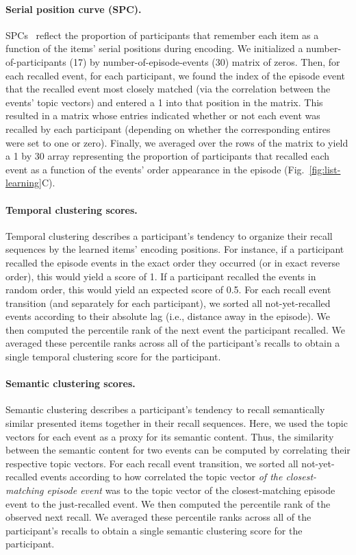 \documentclass{article}
\begin{document}
\paragraph{Serial position curve (SPC).} SPCs~\citep{Murd62a} reflect the proportion of participants that remember each item as a function of the items' serial positions during encoding. We initialized a number-of-participants (17) by number-of-episode-events (30) matrix of zeros. Then, for each recalled event, for each participant, we found the index of the episode event that the recalled event most closely matched (via the correlation between the events' topic vectors) and entered a 1 into that position in the matrix. This resulted in a matrix whose entries indicated whether or not each event was recalled by each participant (depending on whether the corresponding entires were set to one or zero).  Finally, we averaged over the rows of the matrix to yield a 1 by 30 array representing the proportion of participants that recalled each event as a function of the events' order appearance in the episode (Fig.~\ref{fig:list-learning}C).

\paragraph{Temporal clustering scores.} Temporal clustering describes a participant's tendency to organize their recall sequences by the learned items' encoding positions.  For instance, if a participant recalled the episode events in the exact order they occurred (or in exact reverse order), this would yield a score of 1.  If a participant recalled the events in random order, this would yield an expected score of 0.5.  For each recall event transition (and separately for each participant), we sorted all not-yet-recalled events according to their absolute lag (i.e., distance away in the episode).  We then computed the percentile rank of the next event the participant recalled.  We averaged these percentile ranks across all of the participant's recalls to obtain a single temporal clustering score for the participant.

\paragraph{Semantic clustering scores.} Semantic clustering describes a participant's tendency to recall semantically similar presented items together in their recall sequences.  Here, we used the topic vectors for each event as a proxy for its semantic content. Thus, the similarity between the semantic content for two events can be computed by correlating their respective topic vectors.  For each recall event transition, we sorted all not-yet-recalled events according to how correlated the topic vector \textit{of the closest-matching episode event} was to the topic vector of the closest-matching episode event to the just-recalled event.  We then computed the percentile rank of the observed next recall.  We averaged these percentile ranks across all of the participant's recalls to obtain a single semantic clustering score for the participant.
\end{document}
